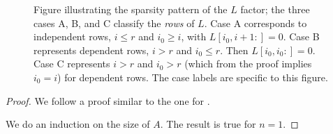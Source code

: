 \documentclass[10pt,twoside]{siamart1116}
\numberwithin{theorem}{section}
\providecommand{\DIFadd}[1]{{\protect\color{blue} \sf #1}} %
\providecommand{\DIFaddend}{} %
\providecommand{\DIFaddFL}[1]{\DIFadd{#1}} %
\begin{document}
\begin{figure}
  \centering
  
  \caption{\label{fig:sparsity} \DIFaddFL{Figure illustrating the sparsity pattern of the $L$ factor; the three cases A, B, and C classify the \emph{rows} of $L$. Case A corresponds to independent rows, $i \le r$ and $i_0 \ge i$, with $L[i_0, i+1:] = 0$. Case B represents dependent rows, $i > r$ and $i_0 \le r$. Then $L[i_0, i_0:] = 0$. Case C represents $i > r$ and $i_0 > r$ (which from the proof implies $i_0 = i$) for dependent rows. The case labels are specific to this figure.}}
\end{figure}

\DIFaddend \begin{proof}
  We follow a proof similar to the one for .

  We do an induction on the size of $A$. The result is true for $n=1$.


\end{proof}
\end{document}
